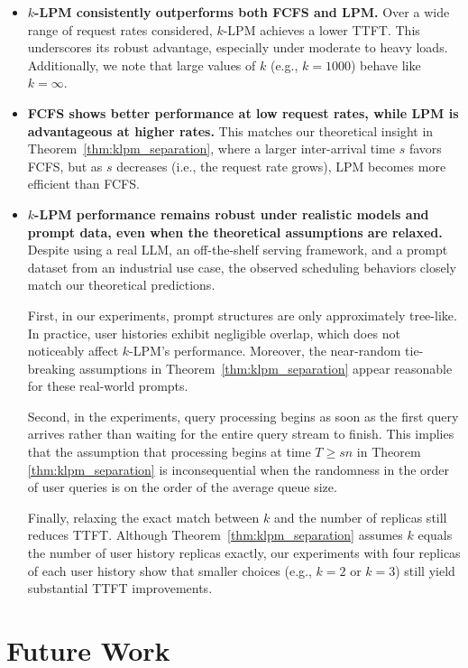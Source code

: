 \begin{itemize}
    \item \textbf{$k$-LPM consistently outperforms both FCFS and LPM.} Over a wide range of request rates considered, $k$-LPM achieves a lower TTFT. This underscores its robust advantage, especially under moderate to heavy loads. Additionally, we note that large values of $k$ (e.g., $k=1000$) behave like $k=\infty$. 
    
    \item \textbf{FCFS shows better performance at low request rates, while LPM is advantageous at higher rates.} This matches our theoretical insight in Theorem~\ref{thm:klpm_separation}, where a larger inter-arrival time $s$ favors FCFS, but as $s$ decreases (i.e., the request rate grows), LPM becomes more efficient than FCFS.

        
    \item \textbf{$k$-LPM performance remains robust under realistic models and prompt data, even when the theoretical assumptions are relaxed.} 
    Despite using a real LLM, an off-the-shelf serving framework, and a prompt dataset from an industrial use case, the observed scheduling behaviors closely match our theoretical predictions. 
    
    First, in our experiments, prompt structures are only approximately tree-like. In practice, user histories exhibit negligible overlap, which does not noticeably affect $k$-LPM's performance. Moreover, the near-random tie-breaking assumptions in Theorem~\ref{thm:klpm_separation} appear reasonable for these real-world prompts. 

    Second, in the experiments, query processing begins as soon as the first query arrives rather than waiting for the entire query stream to finish. This implies that the assumption that processing begins at time $T \geq sn$ in Theorem \ref{thm:klpm_separation} is inconsequential when the randomness in the order of user queries is on the order of the average queue size.
    
    Finally, relaxing the exact match between $k$ and the number of replicas still reduces TTFT. Although Theorem~\ref{thm:klpm_separation} assumes $k$ equals the number of user history replicas exactly, our experiments with four replicas of each user history show that smaller choices (e.g., $k=2$ or $k=3$) still yield substantial TTFT improvements.

\end{itemize}


\section{Future Work}


